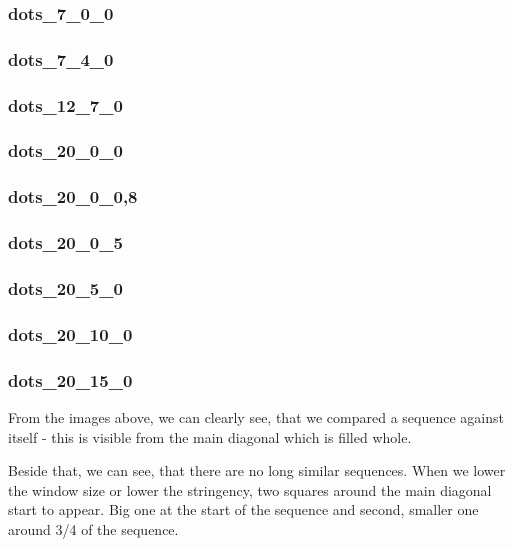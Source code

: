 \documentclass[11pt]{article}
\begin{document}
    \subsubsection{dots\_7\_0\_0}\label{dots_7_0_0}

    \subsubsection{dots\_7\_4\_0}\label{dots_7_4_0}

    \subsubsection{dots\_12\_7\_0}\label{dots_12_7_0}

    \subsubsection{dots\_20\_0\_0}\label{dots_20_0_0}

    \subsubsection{dots\_20\_0\_0,8}\label{dots_20_0_08}

    \subsubsection{dots\_20\_0\_5}\label{dots_20_0_5}

    \subsubsection{dots\_20\_5\_0}\label{dots_20_5_0}

    \subsubsection{dots\_20\_10\_0}\label{dots_20_10_0}

    \subsubsection{dots\_20\_15\_0}\label{dots_20_15_0}

    From the images above, we can clearly see, that we compared a sequence
against itself - this is visible from the main diagonal which is filled
whole.

Beside that, we can see, that there are no long similar sequences. When
we lower the window size or lower the stringency, two squares around the
main diagonal start to appear. Big one at the start of the sequence and
second, smaller one around 3/4 of the sequence.
\end{document}
